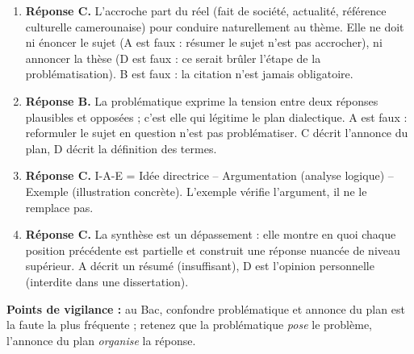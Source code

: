 \documentclass[11pt]{article}
\newcommand{\cle}[1]{{\popxbold\color{popdark}#1}}
\begin{document}
\begin{corrige}
\begin{enumerate}
    \item \textbf{Réponse C.} L'accroche part du réel (fait de société, actualité, référence culturelle camerounaise) pour conduire naturellement au thème. Elle ne doit ni énoncer le sujet (A est faux : résumer le sujet n'est pas accrocher), ni annoncer la thèse (D est faux : ce serait brûler l'étape de la problématisation). B est faux : la citation n'est jamais obligatoire.
    \item \textbf{Réponse B.} La problématique exprime la \cle{tension} entre deux réponses plausibles et opposées ; c'est elle qui légitime le plan dialectique. A est faux : reformuler le sujet en question n'est pas problématiser. C décrit l'annonce du plan, D décrit la définition des termes.
    \item \textbf{Réponse C.} I-A-E = \cle{Idée directrice} -- \cle{Argumentation} (analyse logique) -- \cle{Exemple} (illustration concrète). L'exemple vérifie l'argument, il ne le remplace pas.
    \item \textbf{Réponse C.} La synthèse est un \cle{dépassement} : elle montre en quoi chaque position précédente est partielle et construit une réponse nuancée de niveau supérieur. A décrit un résumé (insuffisant), D est l'opinion personnelle (interdite dans une dissertation).
\end{enumerate}
\textbf{Points de vigilance :} au Bac, confondre problématique et annonce du plan est la faute la plus fréquente ; retenez que la problématique \emph{pose} le problème, l'annonce du plan \emph{organise} la réponse.
\end{corrige}
\end{document}
